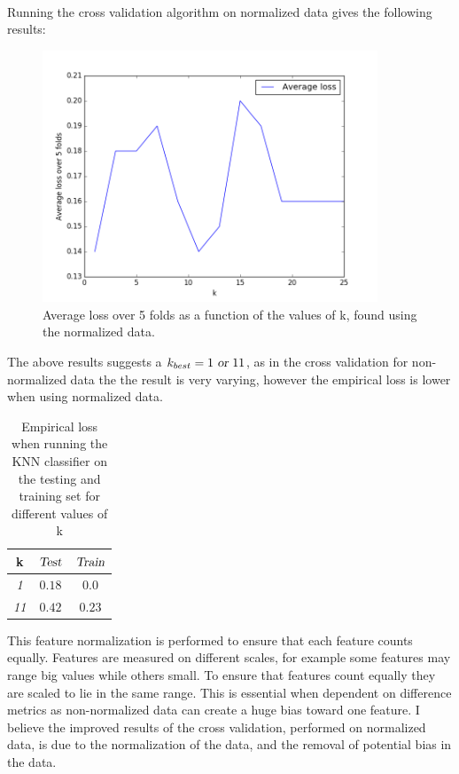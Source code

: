 \documentclass{article}
\begin{document}
\\
Running the cross validation algorithm on normalized data gives the following results:
\begin{figure}[H]
  \centering
  \includegraphics[width=10cm]{ass12.png}
  \caption{Average loss over 5 folds as a function of the values of k, found using the normalized data.}
  \label{fig:boat1}
\end{figure}
The above results suggests a $k_{best} = 1 \textsl{ or } 11$, as in the cross validation for non-normalized data the the result is very varying, however the empirical loss is lower when using normalized data.
\begin{table}[H]
  \centering
  \label{tab:table1}
  \begin{tabular}{c||c|c}
    \textsf{k} & $\textsl{Test}$ & $\textsl{Train}$\\
    \hline
    \textsl{1} & $0.18$ & $0.0$ \\
    \textsl{11} & $ 0.42 $ & $ 0.23 $ \\    
  \end{tabular}
  \caption{Empirical loss when running the KNN classifier on the testing and training set for different values of k} 
\end{table}
This feature normalization is performed to ensure that each feature counts equally. Features are measured on different scales, for example some features may range big values while others small. To ensure that features count equally they are scaled to lie in the same range. This is essential when dependent on difference metrics as non-normalized data can create a huge bias toward one feature. I believe the improved results of the cross validation, performed on normalized data, is due to the normalization of the data, and the removal of potential bias in the data.
\end{document}
